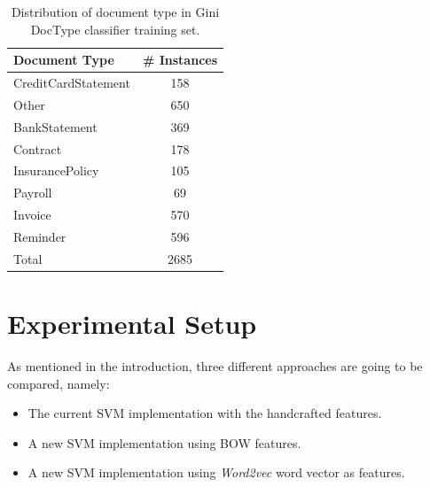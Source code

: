 \begin{table}[h]

  \centering
  \caption{Distribution of document type in  Gini \ac{DocType} classifier training set.}
  \label{tab:doctype_classifier_classes}

\small
\begin{tabular}{|l|c|}
\hline
 \textbf{Document Type}    &  \textbf{\# Instances}  \\
\hline
 CreditCardStatement  &           158  \\
 Other                &           650  \\
 BankStatement        &           369  \\
 Contract             &           178  \\
 InsurancePolicy      &           105  \\
 Payroll              &            69  \\
 Invoice              &           570  \\
 Reminder             &           596  \\
\hline
 Total                &          2685  \\
\hline
\end{tabular}
\end{table}

\section{Experimental Setup}
\label{sec:w2vec_doctype_experimental_setup}

As mentioned in the introduction, three different approaches are going to be
compared, namely:

\begin{itemize}
\item The current \ac{SVM} implementation with the handcrafted features.
\item A new \ac{SVM} implementation using \ac{BOW} features.
\item A new \ac{SVM} implementation using \textit{Word2vec} word vector as features.
\end{itemize}





